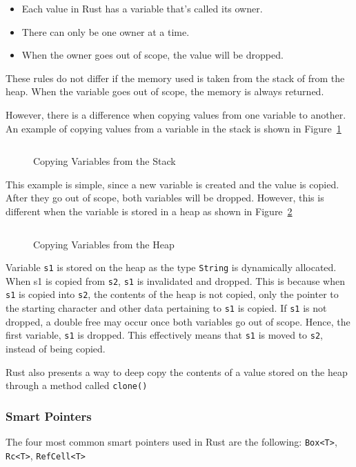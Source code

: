 \documentclass{article}
\newcommand{\rust}[1]{\inputminted{rust}{samples/rust/#1.rs}}
\newcommand{\rustin}[1]{\texttt{#1}}
\begin{document}
  \begin{itemize}
    \item Each value in Rust has a variable that’s called its owner.
    \item There can only be one owner at a time.
    \item When the owner goes out of scope, the value will be dropped.
  \end{itemize}

  These rules do not differ if the memory used is taken from the stack of from
  the heap. When the variable goes out of scope, the memory is always returned.

  However, there is a difference when copying values from one variable to
  another. An example of copying values from a variable in the stack is shown in
  Figure~\ref{fig:copy-stack}

  \begin{figure}[ht]
    \rust{copy-stack}
    \caption{Copying Variables from the Stack}
    \label{fig:copy-stack}
  \end{figure}

  This example is simple, since a new variable is created and the value is
  copied. After they go out of scope, both variables will be dropped. However,
  this is different when the variable is stored in a heap as shown in
  Figure~\ref{fig:copy-heap}

  \begin{figure}[ht]
    \rust{copy-heap}
    \caption{Copying Variables from the Heap}
    \label{fig:copy-heap}
  \end{figure}

  Variable \rustin{s1} is stored on the heap as the type \rustin{String} is
  dynamically allocated. When s1 is copied from \rustin{s2}, \rustin{s1} is
  invalidated and dropped. This is because when \rustin{s1} is copied into
  \rustin{s2}, the contents of the heap is not copied, only the pointer to the
  starting character and other data pertaining to \rustin{s1} is copied. If
  \rustin{s1} is not dropped, a double free may occur once both variables go out
  of scope. Hence, the first variable, \rustin{s1} is dropped. This effectively
  means that \rustin{s1} is moved to \rustin{s2}, instead of being copied.

  Rust also presents a way to deep copy the contents of a value stored on the
  heap through a method called \rustin{clone()}

  \subsubsection{Smart Pointers}
  The four most common smart pointers used in Rust are the following:
  \rustin{Box<T>}, \rustin{Rc<T>}, \rustin{RefCell<T>}
\end{document}
